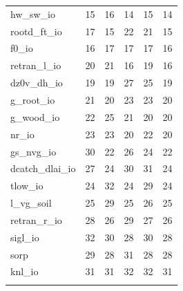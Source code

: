 \documentclass[gmd, manuscript]{copernicus}
\begin{document}
\begin{table}[t]
\begin{tabular}{l r r r r r}
hw\_sw\_io             &           15      &           16     &      14     &       15    &    14 \\ 
rootd\_ft\_io          &           17      &           15     &      22  &          21    &    15 \\ 
f0\_io                &           16      &           17     &      17   &         17    &    16 \\ 
retran\_l\_io          &           20      &           21     &      16   &         19    &    16 \\ 
dz0v\_dh\_io           &           19      &           19     &      27    &        25    &    19 \\ 
g\_root\_io            &           21      &           20     &      23     &       23    &    20 \\ 
g\_wood\_io            &           22      &           25     &      21  &          20    &    20 \\ 
nr\_io                &           23      &           23     &      20   &         22    &    20 \\ 
gs\_nvg\_io            &           30      &           22     &      26    &        24    &    22 \\ 
dcatch\_dlai\_io       &           27      &           24     &      30    &        31    &    24 \\ 
tlow\_io              &           24      &           32     &      24    &        29    &    24 \\ 
l\_vg\_soil            &           25      &           29     &      25    &        26    &    25 \\ 
retran\_r\_io          &           28      &           26     &      29    &        27    &    26 \\ 
sigl\_io              &           32      &           30     &      28    &        30    &    28 \\ 
sorp                 &           29      &           28     &      31    &        28    &    28 \\ 
knl\_io               &           31      &           31     &      32       &     32    &    31 \\ 

\bottomhline
\end{tabular}
\belowtable{} %

\end{table}
\end{document}
